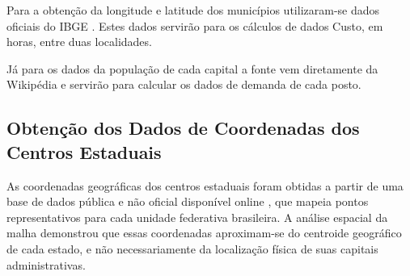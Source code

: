 Para a obtenção da longitude e latitude dos municípios utilizaram-se dados oficiais do IBGE \cite{IBGE:2022}. Estes dados servirão para os cálculos de dados Custo, em horas, entre duas localidades. 

Já para os dados da população de cada capital a fonte vem diretamente da Wikipédia \cite{Wiki:CapitaisPopulacao} e servirão para calcular os dados de demanda de cada posto.


\subsection{Obtenção dos Dados de Coordenadas dos Centros Estaduais}





As coordenadas geográficas dos centros estaduais foram obtidas a partir de uma base de dados pública e não oficial disponível online \cite{ricardobeat:2010}, que mapeia pontos representativos para cada unidade federativa brasileira. A análise espacial da malha demonstrou que essas coordenadas aproximam-se do centroide geográfico de cada estado, e não necessariamente da localização física de suas capitais administrativas.



